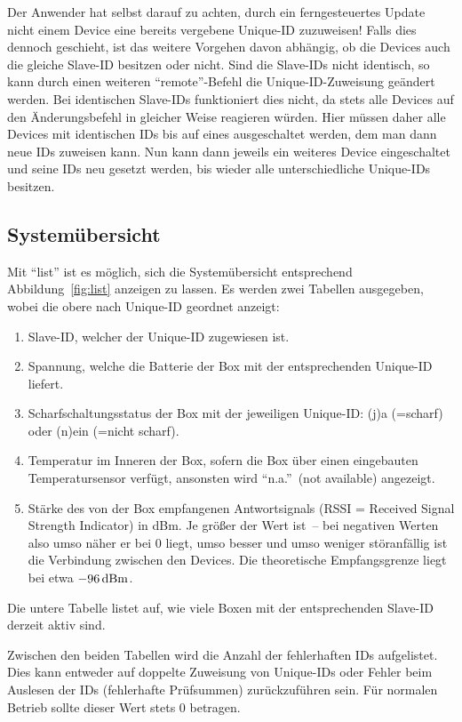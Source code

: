 \documentclass[pdftex, parskip, numbers=noenddot, toc=listof]{scrbook}
\begin{document}
					Der Anwender hat selbst darauf zu achten, durch ein ferngesteuertes Update nicht einem Device eine bereits vergebene Unique-ID zuzuweisen! Falls dies dennoch geschieht, ist das weitere Vorgehen davon abhängig, ob die Devices auch die gleiche Slave-ID besitzen oder nicht. Sind die Slave-IDs nicht identisch, so kann durch einen weiteren \enquote{remote}-Befehl die Unique-ID-Zuweisung geändert werden. Bei identischen Slave-IDs funktioniert dies nicht, da stets alle Devices auf den Änderungsbefehl in gleicher Weise reagieren würden. Hier müssen daher alle Devices mit identischen IDs bis auf eines ausgeschaltet werden, dem man dann neue IDs zuweisen kann. Nun kann dann jeweils ein weiteres Device eingeschaltet und seine IDs neu gesetzt werden, bis wieder alle unterschiedliche Unique-IDs besitzen.

			\subsection{Systemübersicht}
				\label{sec:list}

				Mit \enquote{list} ist es möglich, sich die Systemübersicht entsprechend Abbildung~\ref{fig:list} anzeigen zu lassen. Es werden zwei Tabellen ausgegeben, wobei die obere nach Unique-ID geordnet anzeigt:
				\begin{enumerate}
					\item Slave-ID, welcher der Unique-ID zugewiesen ist.
					\item Spannung, welche die Batterie der Box mit der entsprechenden Unique-ID liefert.
					\item Scharfschaltungsstatus der Box mit der jeweiligen Unique-ID: (j)a (=scharf) oder (n)ein (=nicht scharf).
					\item Temperatur im Inneren der Box, sofern die Box über einen eingebauten Temperatursensor verfügt, ansonsten wird \enquote{n.a.}~(not available) angezeigt.
					\item Stärke des von der Box empfangenen Antwortsignals (RSSI = Received Signal Strength Indicator) in dBm. Je größer der Wert ist~-- bei negativen Werten also umso näher er bei 0 liegt, umso besser und umso weniger störanfällig ist die Verbindung zwischen den Devices. Die theoretische Empfangsgrenze liegt bei etwa $\unit[-96]{dBm}$.
				\end{enumerate}

				Die untere Tabelle listet auf, wie viele Boxen mit der entsprechenden Slave-ID derzeit aktiv sind.

				Zwischen den beiden Tabellen wird die Anzahl der fehlerhaften IDs aufgelistet. Dies kann entweder auf doppelte Zuweisung von Unique-IDs oder Fehler beim Auslesen der IDs (fehlerhafte Prüfsummen) zurückzuführen sein. Für normalen Betrieb sollte dieser Wert stets 0 betragen.
\end{document}
